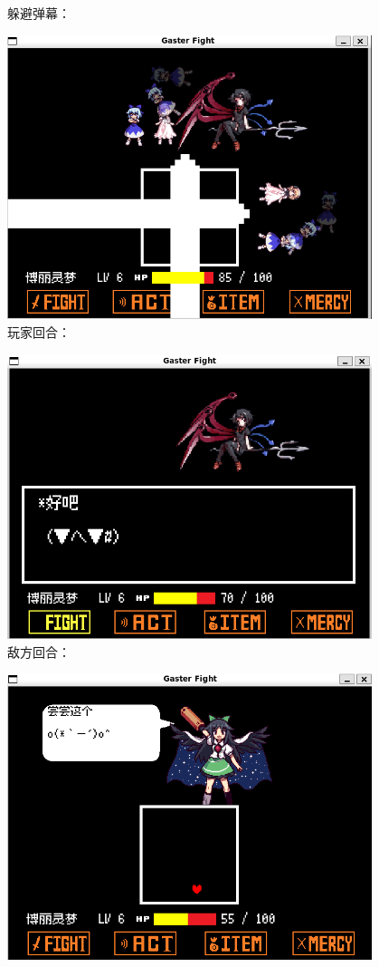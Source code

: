 \documentclass{article}
\begin{document}
躲避弹幕：


\includegraphics[width=0.8\textwidth]{figure/result2.png}\\

玩家回合：

\includegraphics[width=0.8\textwidth]{figure/result3.png}\\

敌方回合：

\includegraphics[width=0.8\textwidth]{figure/result4.png}\\
\end{document}
